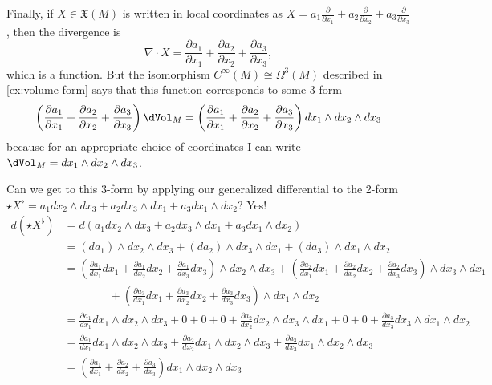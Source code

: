 Finally, if $X \in \mathfrak{X}(M)$ is written in local coordinates as $X = a_1 \frac{\partial }{\partial x_1} + a_2 \frac{\partial }{\partial x_2} + a_3 \frac{\partial }{\partial x_3}$, then the divergence is
\[
	\nabla \cdot X = \frac{\partial a_1}{\partial x_1} + \frac{\partial a_2}{\partial x_2} + \frac{\partial a_3}{\partial x_3},
\]
which is a function. But the isomorphism $C^\infty(M) \cong \Omega^3(M)$ described in \cref{ex:volume form} says that this function corresponds to some 3-form
\[
	\left(\frac{\partial a_1}{\partial x_1} + \frac{\partial a_2}{\partial x_2} + \frac{\partial a_3}{\partial x_3}\right) \dVol_M = \left(\frac{\partial a_1}{\partial x_1} + \frac{\partial a_2}{\partial x_2} + \frac{\partial a_3}{\partial x_3}\right)dx_1 \wedge dx_2 \wedge dx_3
\]
because for an appropriate choice of coordinates I can write $\dVol_M = dx_1 \wedge dx_2 \wedge dx_3$.

Can we get to this 3-form by applying our generalized differential to the 2-form $\star X^\flat = a_1 dx_2 \wedge dx_3 + a_2 dx_3 \wedge dx_1 + a_3 dx_1 \wedge dx_2$? Yes!
\begin{align*}
	d(\star X^\flat) & = d(a_1 dx_2 \wedge dx_3 + a_2 dx_3 \wedge dx_1 + a_3 dx_1 \wedge dx_2) \\
	& = (da_1) \wedge dx_2 \wedge dx_3 + (da_2) \wedge dx_3 \wedge dx_1 + (da_3) \wedge dx_1 \wedge dx_2 \\
	& = \left( \frac{\partial a_1}{dx_1} dx_1  + \frac{\partial a_1}{dx_2} dx_2 + \frac{\partial a_1}{dx_3} dx_3 \right)\wedge dx_2 \wedge dx_3 + \left( \frac{\partial a_2}{dx_1} dx_1  + \frac{\partial a_2}{dx_2} dx_2 + \frac{\partial a_2}{dx_3} dx_3 \right)\wedge dx_3 \wedge dx_1 \\
	& \qquad \qquad + \left( \frac{\partial a_3}{dx_1} dx_1  + \frac{\partial a_3}{dx_2} dx_2 + \frac{\partial a_3}{dx_3} dx_3 \right)\wedge dx_1 \wedge dx_2 \\
	& = \frac{\partial a_1}{dx_1} dx_1\wedge dx_2 \wedge dx_3 + 0 + 0 + 0 + \frac{\partial a_2}{dx_2} dx_2 \wedge dx_3 \wedge dx_1 + 0 + 0 +  \frac{\partial a_3}{dx_3} dx_3 \wedge dx_1 \wedge dx_2 \\
	& = \frac{\partial a_1}{dx_1} dx_1\wedge dx_2 \wedge dx_3 + \frac{\partial a_2}{dx_2} dx_1 \wedge dx_2 \wedge dx_3 + \frac{\partial a_3}{dx_3} dx_1 \wedge dx_2 \wedge dx_3 \\
	& = \left(\frac{\partial a_1}{dx_1} + \frac{\partial a_2}{dx_2} + \frac{\partial a_3}{dx_3}\right) dx_1 \wedge dx_2 \wedge dx_3
\end{align*}


